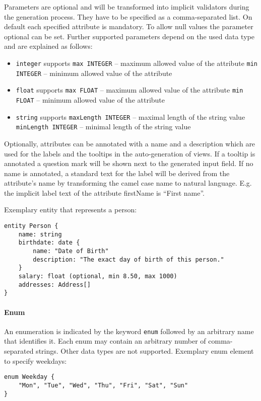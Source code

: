 Parameters are optional and will be transformed into implicit validators during the generation process. They have to be specified as a comma-separated list. On default each specified attribute is mandatory. To allow null values the parameter optional can be set. Further supported parameters depend on the used data type and are explained as follows:

\begin{itemize}
\item \lstinline!integer! supports
\subitem \lstinline!max INTEGER! – maximum allowed value of the attribute
\subitem \lstinline!min INTEGER! – minimum allowed value of the attribute
\item \lstinline!float! supports
\subitem \lstinline!max FLOAT! – maximum allowed value of the attribute
\subitem \lstinline!min FLOAT! – minimum allowed value of the attribute
\item \lstinline!string! supports
\subitem \lstinline!maxLength INTEGER! – maximal length of the string value
\subitem \lstinline!minLength INTEGER! – minimal length of the string value
\end{itemize}

Optionally, attributes can be annotated with a name and a description which are used for the labels and the tooltips in the auto-generation of views. If a tooltip is annotated a question mark will be shown next to the generated input field. If no name is annotated, a standard text for the label will be derived from the attribute's name by transforming the camel case name to natural language. E.g. the implicit label text of the attribute firstName is \enquote{First name}.

Exemplary entity that represents a person:
\begin{lstlisting}
entity Person {
	name: string
	birthdate: date {
		name: "Date of Birth"
		description: "The exact day of birth of this person."
	}
	salary: float (optional, min 8.50, max 1000)
	addresses: Address[]
}
\end{lstlisting}

\paragraph{Enum}
An enumeration is indicated by the keyword \lstinline!enum! followed by an arbitrary name that identifies it. Each enum may contain an arbitrary number of comma-separated strings. Other data types are not supported.
Exemplary enum element to specify weekdays:
\begin{lstlisting}
enum Weekday {
	"Mon", "Tue", "Wed", "Thu", "Fri", "Sat", "Sun"
}
\end{lstlisting}